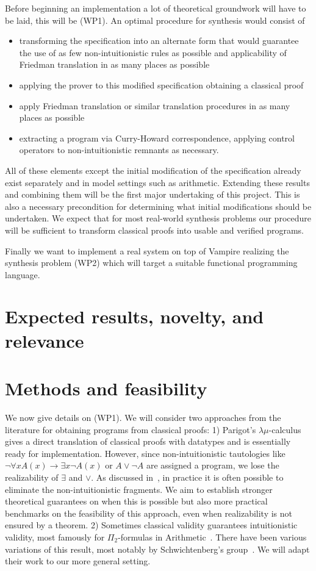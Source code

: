 \documentclass[a4paper,12pt]{article}
\begin{document}
	Before beginning an implementation a lot of theoretical groundwork will have to be laid, this will be (WP1). An optimal procedure for synthesis would consist of
	\begin{itemize}
		\item transforming the specification into an alternate form that would guarantee the use of as few non-intuitionistic rules as possible and applicability of Friedman translation in as many places as possible
		\item applying the prover to this modified specification obtaining a classical proof
		\item apply Friedman translation or similar translation procedures in as many places as possible
		\item extracting a program via Curry-Howard correspondence, applying control operators to non-intuitionistic remnants as necessary.
	\end{itemize}
	All of these elements except the initial modification of the specification already exist separately and in model settings such as arithmetic. Extending these results and combining them will be the first major undertaking of this project. This is also a necessary precondition for determining what initial modifications should be undertaken. We expect that for most real-world synthesis problems our procedure will be sufficient to transform classical proofs into usable and verified programs.
	
	Finally we want to implement a real system on top of Vampire realizing the synthesis problem (WP2) which will target a suitable functional programming language.
	
	\section{Expected results, novelty, and relevance}

	
	

	\section{Methods and feasibility}
	
		
	We now give details on (WP1). We will consider two approaches from the literature for obtaining programs from classical proofs: 1) Parigot's $\lambda\mu$-calculus~\cite{Parigot1} gives a direct translation of classical proofs with datatypes and is essentially ready for implementation. However, since non-intuitionistic tautologies like $\neg\forall xA(x)\to \exists x\neg A(x)$ or $A\vee \neg A$ are assigned a program, we lose the realizability of $\exists$ and $\vee$. As discussed in~\cite{practical}, in practice it is often possible to eliminate the non-intuitionistic fragments. We aim to establish stronger theoretical guarantees on when this is possible but also more practical benchmarks on the feasibility of this approach, even when realizability is not ensured by a theorem. 2) Sometimes classical validity guarantees intuitionistic validity, most famously for $\Pi_2$-formulas in Arithmetic~\cite{Friedman}. There have been various variations of this result, most notably by Schwichtenberg's group~\cite{schwichtenberg}. We will adapt their work to our more general setting.
	
\end{document}
